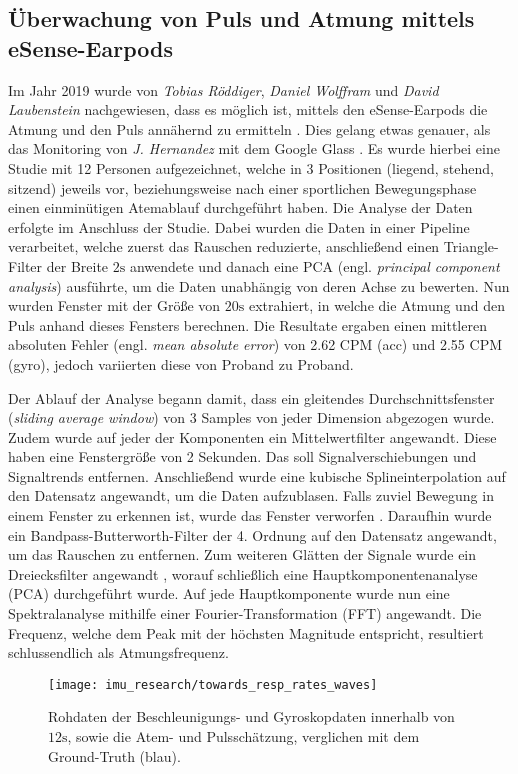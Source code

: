 \subsection{Überwachung von Puls und Atmung mittels eSense-Earpods}
Im Jahr 2019 wurde von \textit{Tobias Röddiger}, \textit{Daniel Wolffram} und \textit{David Laubenstein} nachgewiesen, dass es möglich ist, mittels den eSense-Earpods die Atmung und den Puls annähernd zu ermitteln \cite{roddigerRespirationRateMonitoring2019}. 
Dies gelang etwas genauer, als das Monitoring von \textit{J. Hernandez} mit dem Google Glass \cite{hernandezCardiacRespiratoryParameter}.
Es wurde hierbei eine Studie mit 12 Personen aufgezeichnet, welche in 3 Positionen (liegend, stehend, sitzend) jeweils vor, beziehungsweise nach einer sportlichen Bewegungsphase einen einminütigen Atemablauf durchgeführt haben. 
Die Analyse der Daten erfolgte im Anschluss der Studie.
Dabei wurden die Daten in einer Pipeline verarbeitet, welche zuerst das Rauschen reduzierte, anschließend einen Triangle-Filter der Breite $2\si{\s}$ anwendete und danach eine PCA (engl. \textit{principal component analysis}) ausführte, um die Daten unabhängig von deren Achse zu bewerten.
Nun wurden Fenster mit der Größe von $20\si{\s}$ extrahiert, in welche die Atmung und den Puls anhand dieses Fensters berechnen.
Die Resultate ergaben einen mittleren absoluten Fehler (engl. \textit{mean absolute error}) von 2.62 CPM (acc) und 2.55 CPM (gyro), jedoch variierten diese von Proband zu Proband.

Der Ablauf der Analyse begann damit, dass ein gleitendes Durchschnittsfenster (\textit{sliding average window}) von 3 Samples von jeder Dimension abgezogen wurde. 
Zudem wurde auf jeder der Komponenten ein Mittelwertfilter angewandt. 
Diese haben eine Fenstergröße von 2 Sekunden. 
Das soll Signalverschiebungen und Signaltrends entfernen.
Anschließend wurde eine kubische Splineinterpolation auf den Datensatz angewandt, um die Daten aufzublasen.
Falls zuviel Bewegung in einem Fenster zu erkennen ist, wurde das Fenster verworfen \cite{sunSleepMonitorMonitoringRespiratory2017}.
Daraufhin wurde ein Bandpass-Butterworth-Filter der 4. Ordnung auf den Datensatz angewandt, um das Rauschen zu entfernen.
Zum weiteren Glätten der Signale wurde ein Dreiecksfilter angewandt \cite{haotianMindfulWatch2017}, worauf schließlich eine Hauptkomponentenanalyse (PCA) durchgeführt wurde.
Auf jede Hauptkomponente wurde nun eine Spektralanalyse mithilfe einer Fourier-Transformation (FFT) angewandt. 
Die Frequenz, welche dem Peak mit der höchsten Magnitude entspricht, resultiert schlussendlich als Atmungsfrequenz.

\begin{figure}[ht]
    \texttt{[image: imu\_research/towards\_resp\_rates\_waves]}
    \caption{Rohdaten der Beschleunigungs- und Gyroskopdaten innerhalb von $12 \si{\s}$, sowie die Atem- und Pulsschätzung, verglichen mit dem Ground-Truth (blau).}
    \label{background:towards_resp_esense:results}
\end{figure}